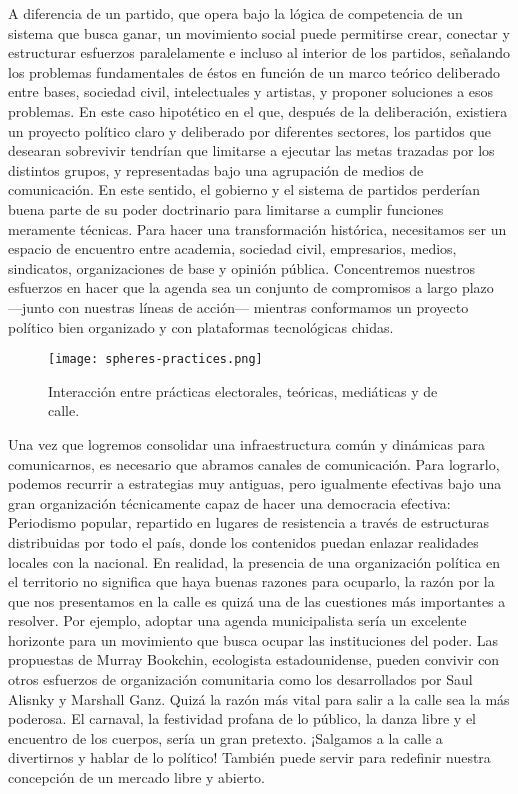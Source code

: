 A diferencia de un partido, que opera bajo la lógica de competencia de un sistema que busca ganar, un movimiento social puede permitirse crear, conectar y estructurar esfuerzos paralelamente e incluso al interior de los partidos, señalando los problemas fundamentales de éstos en función de un marco teórico deliberado entre bases, sociedad civil, intelectuales y artistas, y proponer soluciones a esos problemas. En este caso hipotético en el que, después de la deliberación, existiera un proyecto político claro y deliberado por diferentes sectores, los partidos que desearan sobrevivir tendrían que limitarse a ejecutar las metas trazadas por los distintos grupos, y representadas bajo una agrupación de medios de comunicación. En este sentido, el gobierno y el sistema de partidos perderían buena parte de su poder doctrinario para limitarse a cumplir funciones meramente técnicas. Para hacer una transformación histórica, necesitamos ser un espacio de encuentro entre academia, sociedad civil, empresarios, medios, sindicatos, organizaciones de base y opinión pública. Concentremos nuestros esfuerzos en hacer que la agenda sea un conjunto de compromisos a largo plazo ---junto con nuestras líneas de acción--- mientras conformamos un proyecto político bien organizado y con plataformas tecnológicas chidas.

\begin{figure}[htbp]
	\centering	\texttt{[image: spheres-practices.png]}
	\caption{Interacción entre prácticas electorales, teóricas, mediáticas y de calle.}
	\label{fig:interacciones}
\end{figure}

Una vez que logremos consolidar una infraestructura común y dinámicas para comunicarnos, es necesario que abramos canales de comunicación. Para lograrlo, podemos recurrir a estrategias muy antiguas, pero igualmente efectivas bajo una gran organización técnicamente capaz de hacer una democracia efectiva: Periodismo popular, repartido en lugares de resistencia a través de estructuras distribuidas por todo el país, donde los contenidos puedan enlazar realidades locales con la nacional. En realidad, la presencia de una organización política en el territorio no significa que haya buenas razones para ocuparlo, la razón por la que nos presentamos en la calle es quizá una de las cuestiones más importantes a resolver. Por ejemplo, adoptar una agenda municipalista sería un excelente horizonte para un movimiento que busca ocupar las instituciones del poder. Las propuestas de Murray Bookchin, ecologista estadounidense, pueden convivir con otros esfuerzos de organización comunitaria como los desarrollados por Saul Alisnky y Marshall Ganz. Quizá la razón más vital para salir a la calle sea la más poderosa. El carnaval, la festividad profana de lo público, la danza libre y el encuentro de los cuerpos, sería un gran pretexto. ¡Salgamos a la calle a divertirnos y hablar de lo político! También puede servir para redefinir nuestra concepción de un mercado libre y abierto.

